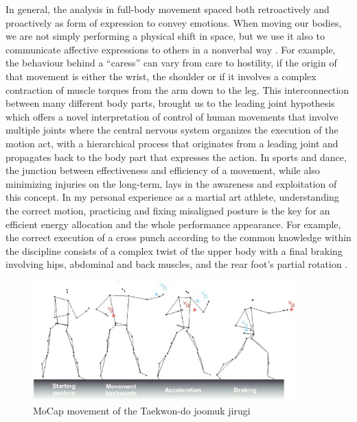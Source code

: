 In general, the analysis in full-body movement spaced both retroactively and proactively as form of expression to convey emotions. 
When moving our bodies, we are not simply performing a physical shift in space, but we use it also to 
communicate affective expressions to others in a nonverbal way \cite{gelder:2009,kleinsmith:2013,karg:2013}. 
For example, the behaviour behind a “caress” can vary from care to hostility, 
if the origin of that movement is either the wrist, the shoulder or if it involves a complex 
contraction of muscle torques from the arm down to the leg. 
This interconnection between many different body parts, brought us to the leading joint hypothesis \cite{dounskaia:2010} 
which offers a novel interpretation of control of human movements that involve multiple joints 
where the central nervous system organizes the execution of the motion act, with a hierarchical process 
that originates from a leading joint and propagates back to the body part that expresses the action. 
In sports and dance, the junction between effectiveness and efficiency of a movement, while also minimizing injuries on the long-term, 
lays in the awareness and exploitation of this concept. 
In my personal experience as a martial art athlete, understanding the correct motion, 
practicing and fixing misaligned posture is the key for an efficient energy allocation and the whole performance appearance. 
For example, the correct execution of a cross punch according to the common 
knowledge within the discipline consists of a complex 
twist of the upper body with a final braking involving hips, abdominal and back muscles, 
and the rear foot’s partial rotation \cite{wasik:2013}.
\begin{figure}[H]
    \centering
    \includegraphics[width=0.9\textwidth]{graphics/Taekwon-do-joomuk-jirugi.jpeg}
    \caption{MoCap movement of the Taekwon-do joomuk jirugi}
    \label{fig:example}
\end{figure}